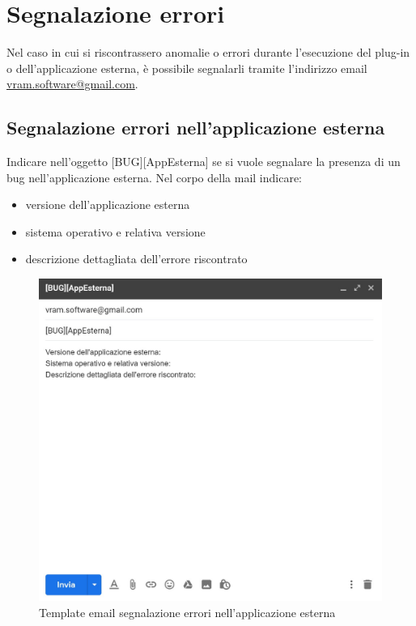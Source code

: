 \section{Segnalazione errori}
Nel caso in cui si riscontrassero anomalie o errori durante l'esecuzione del plug-in o dell'applicazione esterna, è possibile segnalarli tramite l'indirizzo email {\url{vram.software@gmail.com}}.
	\subsection{Segnalazione errori nell'applicazione esterna}
	Indicare nell'oggetto [BUG][AppEsterna] se si vuole segnalare la presenza di un bug nell'applicazione esterna.
	Nel corpo della mail indicare:
	\begin{itemize}
		\item versione dell'applicazione esterna
		\item sistema operativo e relativa versione
		\item descrizione dettagliata dell'errore riscontrato
	\end{itemize}
	\mbox{}
	\begin{figure} [H]
		\begin{center}
			\includegraphics[width=120mm]{./img/erroriApp.jpg}
		\end{center}
		\caption{Template email segnalazione errori nell'applicazione esterna}
	\end{figure}
	\mbox{}
